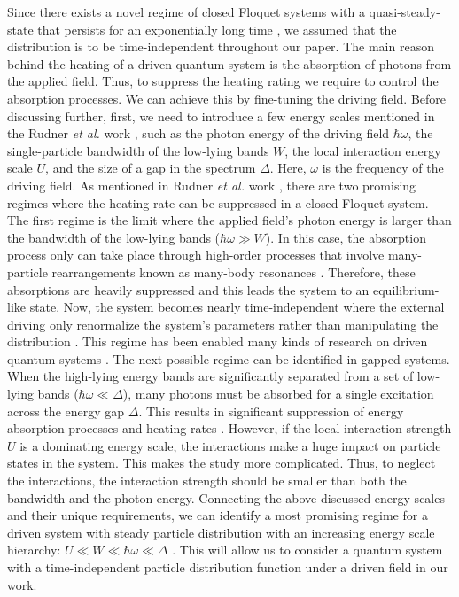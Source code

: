 \documentclass{article}
\begin{document}
Since there exists a novel regime of closed Floquet systems with a quasi-steady-state that persists for an exponentially long time \cite{lindner2017}, we assumed that the distribution is to be time-independent throughout our paper. The main reason behind the heating of a driven quantum system is the absorption of photons from the applied field. Thus, to suppress the heating rating we require to control the absorption processes. We can achieve this by fine-tuning the driving field. Before discussing further, first, we need to introduce a few energy scales mentioned in the Rudner \textit{et al.} work \cite{rudner2020}, such as the photon energy of the driving field $\hbar\omega$, the single-particle bandwidth of the low-lying bands $W$, the local interaction energy scale $U$, and the size of a gap in the spectrum $\Delta$.  Here, $\omega$ is the frequency of the driving field.
As mentioned in Rudner \textit{et al.} work \cite{rudner2020}, there are two promising regimes where the heating rate can be suppressed in a closed Floquet system. The first regime is the limit where the applied field's photon energy is larger than the bandwidth of the low-lying bands ($\hbar\omega \gg W$). In this case, the absorption process only can take place through high-order processes that involve many-particle rearrangements known as many-body resonances  \cite{bukov2016,lindner2017,rudner2020}. Therefore, these absorptions are heavily suppressed and this leads the system to an equilibrium-like
state. Now, the system becomes nearly time-independent where the external driving only renormalize the system's parameters rather than manipulating the distribution \cite{wackerlthesis20}.
This regime has been enabled many kinds of research on driven quantum systems \cite{kitagawa2011,lopez2015,pervishko2015,bukov2015,yudin2016}.
The next possible regime can be identified in gapped systems. When the high-lying energy bands are significantly separated from a set of low-lying bands ($\hbar\omega \ll \Delta$), many photons must be absorbed for a single excitation across the energy gap $\Delta$. This results in significant suppression of energy absorption processes and heating rates \cite{rudner2020}. However, if the local interaction strength $U$ is a dominating energy scale, the interactions make a huge impact on particle states in the system. This makes the study more complicated. Thus, to neglect the interactions, the interaction strength should be smaller than both the bandwidth and the photon energy. Connecting the above-discussed energy scales and their unique requirements, we can identify a most promising regime for a driven system with steady particle distribution with an increasing energy scale hierarchy: $U \ll W \ll \hbar\omega \ll \Delta$ \cite{wackerlthesis20}. This will allow us to consider a quantum system with a time-independent particle distribution function under a driven field in our work.
\end{document}
